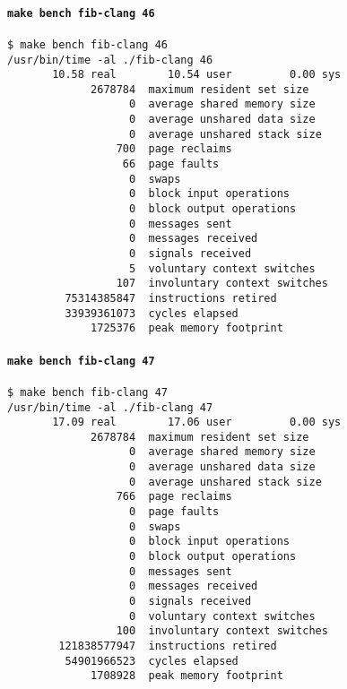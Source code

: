 \documentclass{article}
\begin{document}
\paragraph{\lstinline!make bench fib-clang 46!}
\begin{lstlisting}[language=none]
$ make bench fib-clang 46
/usr/bin/time -al ./fib-clang 46
       10.58 real        10.54 user         0.00 sys
             2678784  maximum resident set size
                   0  average shared memory size
                   0  average unshared data size
                   0  average unshared stack size
                 700  page reclaims
                  66  page faults
                   0  swaps
                   0  block input operations
                   0  block output operations
                   0  messages sent
                   0  messages received
                   0  signals received
                   5  voluntary context switches
                 107  involuntary context switches
         75314385847  instructions retired
         33939361073  cycles elapsed
             1725376  peak memory footprint
\end{lstlisting}



\paragraph{\lstinline!make bench fib-clang 47!}
\begin{lstlisting}[language=none]
$ make bench fib-clang 47
/usr/bin/time -al ./fib-clang 47
       17.09 real        17.06 user         0.00 sys
             2678784  maximum resident set size
                   0  average shared memory size
                   0  average unshared data size
                   0  average unshared stack size
                 766  page reclaims
                   0  page faults
                   0  swaps
                   0  block input operations
                   0  block output operations
                   0  messages sent
                   0  messages received
                   0  signals received
                   0  voluntary context switches
                 100  involuntary context switches
        121838577947  instructions retired
         54901966523  cycles elapsed
             1708928  peak memory footprint
\end{lstlisting}
\end{document}
